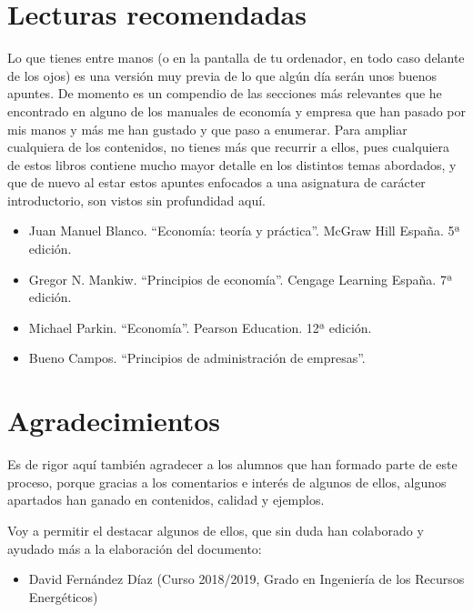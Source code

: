 \documentclass[
]{krantz}
\providecommand{\tightlist}{%
  \setlength{\itemsep}{0pt}\setlength{\parskip}{0pt}}
\begin{document}
\hypertarget{lecturas-recomendadas}{%
\section*{Lecturas recomendadas}\label{lecturas-recomendadas}}


Lo que tienes entre manos (o en la pantalla de tu ordenador, en todo caso delante de los ojos) es una versión muy previa de lo que algún día serán unos buenos apuntes. De momento es un compendio de las secciones más relevantes que he encontrado en alguno de los manuales de economía y empresa que han pasado por mis manos y más me han gustado y que paso a enumerar. Para ampliar cualquiera de los contenidos, no tienes más que recurrir a ellos, pues cualquiera de estos libros contiene mucho mayor detalle en los distintos temas abordados, y que de nuevo al estar estos apuntes enfocados a una asignatura de carácter introductorio, son vistos sin profundidad aquí.

\begin{itemize}
\tightlist
\item
  Juan Manuel Blanco. ``Economía: teoría y práctica''. McGraw Hill España. 5ª edición.
\item
  Gregor N. Mankiw. ``Principios de economía''. Cengage Learning España. 7ª edición.
\item
  Michael Parkin. ``Economía''. Pearson Education. 12ª edición.
\item
  Bueno Campos. ``Principios de administración de empresas''.
\end{itemize}

\hypertarget{agradecimientos}{%
\section*{Agradecimientos}\label{agradecimientos}}


Es de rigor aquí también agradecer a los alumnos que han formado parte de este proceso, porque gracias a los comentarios e interés de algunos de ellos, algunos apartados han ganado en contenidos, calidad y ejemplos.

Voy a permitir el destacar algunos de ellos, que sin duda han colaborado y ayudado más a la elaboración del documento:

\begin{itemize}
\tightlist
\item
  David Fernández Díaz (Curso 2018/2019, Grado en Ingeniería de los Recursos Energéticos)
\end{itemize}
\end{document}
